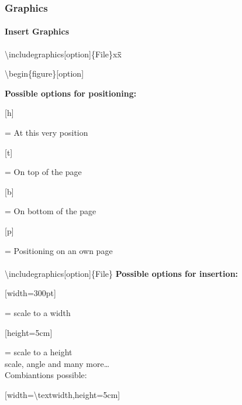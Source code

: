 \begin{frame}
\frametitle{Graphics}
\framesubtitle{Insert Graphics}
\begin{tabbing}
\textbackslash includegraphics[option]\{File\}xx\=\=\=\kill
\begin{ttfamily}
\color{unibablueI}\textbackslash begin\color{black}\{figure\}\color{nounibagreenI}[option]\color{black}
\end{ttfamily}
\>\>\textbf{Possible options for positioning:}\\
\>\>\begin{ttfamily}\color{nounibagreenI}[h]\color{black}\end{ttfamily} = At this very position\\
\>\>\begin{ttfamily}\color{nounibagreenI}[t]\color{black}\end{ttfamily} = On top of the page\\
\>\>\begin{ttfamily}\color{nounibagreenI}[b]\color{black}\end{ttfamily} = On bottom of the page\\
\>\>\begin{ttfamily}\color{nounibagreenI}[p]\color{black}\end{ttfamily} = Positioning on an own
page\\[5mm]
~\\[5mm]
\color{nounibaredI}\textbackslash includegraphics\color{nounibagreenI}[option]\color{black}\{File\}
\>\>\textbf{Possible options for insertion:}\\
\>\>\begin{ttfamily}\color{nounibagreenI}[width=300pt]\color{black}\end{ttfamily}= scale to a width\\
\>\>\begin{ttfamily}\color{nounibagreenI}[height=5cm]\color{black}\end{ttfamily}= scale to a height\\
\>\>scale, angle and many more\ldots\\
\>\>Combiantions possible:\\
\>\>\begin{ttfamily}\color{nounibagreenI}[width=\textbackslash textwidth,height=5cm]\color{black}\end{ttfamily}
\end{tabbing}
\end{frame}


